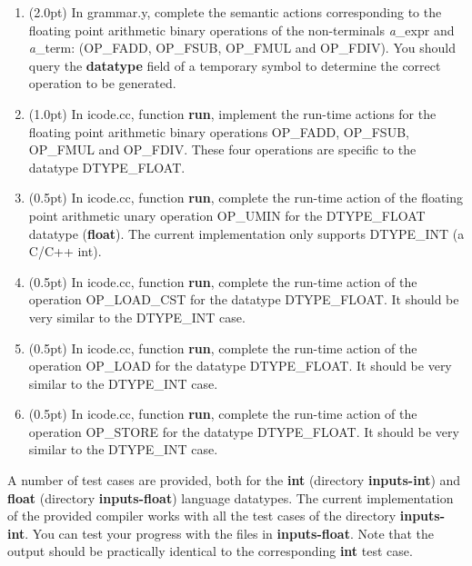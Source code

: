 \documentclass[letter,10pt]{article}
\begin{document}
\begin{enumerate}

\item (2.0pt)
In grammar.y, complete the semantic actions corresponding to the floating point arithmetic binary operations 
of the non-terminals {\textit a\_expr} and {\textit a\_term}: (OP\_FADD, OP\_FSUB, OP\_FMUL and OP\_FDIV).
You should query the {\bf datatype} field of a temporary symbol to determine the correct operation to be generated.

\item (1.0pt)
In icode.cc, function {\bf run}, implement the run-time actions for the floating point arithmetic binary operations
OP\_FADD, OP\_FSUB, OP\_FMUL and OP\_FDIV. These four operations are specific to the datatype DTYPE\_FLOAT.

\item (0.5pt)
In icode.cc, function {\bf run}, complete the run-time action of the floating point arithmetic unary operation
OP\_UMIN for the DTYPE\_FLOAT datatype ({\bf float}). The current implementation only supports DTYPE\_INT (a C/C++ int). 


\item (0.5pt)
In icode.cc, function {\bf run}, complete the run-time action of the operation OP\_LOAD\_CST for the datatype DTYPE\_FLOAT.
It should be very similar to the DTYPE\_INT case.

\item (0.5pt)
In icode.cc, function {\bf run}, complete the run-time action of the operation OP\_LOAD for the datatype DTYPE\_FLOAT.
It should be very similar to the DTYPE\_INT case.

\item (0.5pt)
In icode.cc, function {\bf run}, complete the run-time action of the operation OP\_STORE for the datatype DTYPE\_FLOAT.
It should be very similar to the DTYPE\_INT case.


\end{enumerate}

A number of test cases are provided, both for the {\bf int} (directory {\bf inputs-int}) and {\bf float} (directory {\bf inputs-float}) 
language datatypes.
The current implementation of the provided compiler works with all the test cases of the directory {\bf inputs-int}.
You can test your progress with the files in {\bf inputs-float}. Note that the output should be practically identical to
the corresponding {\bf int} test case.
\end{document}
